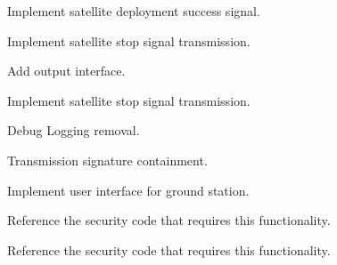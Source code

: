 
\begin{DoxyRefList}
\item[\label{todo__todo000004}%
\Hypertarget{todo__todo000004}%
Member \mbox{\hyperlink{communication_8h_a649fe6cc16cc68a0eda736de6d670ea4}{Communication\+\_\+\+Received\+Deployment\+Success}} ()]Implement satellite deployment success signal.  
\item[\label{todo__todo000002}%
\Hypertarget{todo__todo000002}%
Member \mbox{\hyperlink{communication_8h_ab24ce0353afa549bb631933e8cfe9343}{Communication\+\_\+\+Received\+Stopped\+Signal}} ()]Implement satellite stop signal transmission.  
\item[\label{todo__todo000003}%
\Hypertarget{todo__todo000003}%
Member \mbox{\hyperlink{communication_8h_a9120f84592164d2c696fc5d8b9948ac1}{Communication\+\_\+\+Received\+Transmitted\+Online}} ()]Add output interface. 

Implement satellite stop signal transmission. 
\item[\label{todo__todo000001}%
\Hypertarget{todo__todo000001}%
Member \mbox{\hyperlink{communication_8h_a68fd88d1ccfc91925d30c0fdf1b417ab}{Communication\+\_\+\+S\+X1278\+Transmit}} (String in\+Func\+Id, String in\+Message)]Debug Logging removal. 

Transmission signature containment.  
\item[\label{todo__todo000005}%
\Hypertarget{todo__todo000005}%
Member \mbox{\hyperlink{communication_8h_a639d7624642ba6e8f368f15b89d1b557}{Communication\+\_\+\+Transmit\+Ping}} ()]Implement user interface for ground station.  
\item[\label{todo__todo000007}%
\Hypertarget{todo__todo000007}%
Member \mbox{\hyperlink{communication_8h_aa11cefca5402f3a480be0b8448916dab}{Communication\+\_\+\+Transmit\+Start\+Transmitting}} ()]Reference the security code that requires this functionality.  
\item[\label{todo__todo000006}%
\Hypertarget{todo__todo000006}%
Member \mbox{\hyperlink{communication_8h_a7d368a63e53f4a1a63b166e6e97c7805}{Communication\+\_\+\+Transmit\+Stop\+Transmitting}} ()]Reference the security code that requires this functionality. 
\end{DoxyRefList}